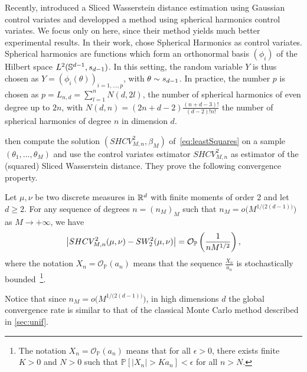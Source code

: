 {Recently, \citet{nguyen2024slicedwassersteinestimationcontrol} introduced a Sliced Wasserstein distance estimation using Gaussian control variates and \citet{leluc2024slicedwassersteinestimationsphericalharmonics} developped a method using spherical harmonics control variates. We focus only on \citet{leluc2024slicedwassersteinestimationsphericalharmonics} here, since their method yields much better experimental results.} 
In their work, \citet{leluc2024slicedwassersteinestimationsphericalharmonics} chose Spherical Harmonics
\citep{Muller1998} as control variates. 
Spherical harmonics are functions which form an orthonormal basis $(\phi_i)$ of the Hilbert space $L^2(\mathbb{S}^{d-1},s_{d-1})$.  
In this setting, the random variable $Y$ is thus chosen as $Y = (\phi_i(\theta))_{i = 1,\hdots,p}$, with $\theta \sim s_{d-1}$. In practice, the number $p$  is chosen as $p = L_{n,d} = \displaystyle\sum\limits_{l = 1}^n N(d,2l)$, the number of spherical harmonics of even degree up to $2n$, with $N(d,n) = (2n +d -2)\frac{(n + d -3)!}{(d-2)!n!}$ the number of spherical harmonics of degree $n$ in dimension $d$.




\citet{leluc2024slicedwassersteinestimationsphericalharmonics} then compute the  solution $(SHCV_{M,n}^2,\beta_M)$ of~\eqref{eq:leastSquares} on a sample $(\theta_1,\hdots,\theta_M)$ and use the control variates estimator $SHCV_{M,n}^2$ as  estimator of the (squared) Sliced Wasserstein distance. 
They prove the following convergence property.
\begin{Prop}
Let $\mu,\nu$ be two discrete measures in $\mathbb{R}^d$ with finite moments of order 2 and let $d \geq 2$.
For any sequence of degrees $n = (n_M)_M$ such that $n_M = o\bigg(M^{1/\big(2(d-1)\big)}\bigg)$ as $M\longrightarrow +\infty$, we have
\begin{equation}\label{eq:SHCVConv}
\big|SHCV_{M,n}^2(\mu,\nu) - SW_2^2(\mu,\nu)\big| = \mathcal{O}_{\mathbb{P}}\left(\frac{1}{n M^{1/2}}\right), 
\end{equation}
where the notation $X_n = \mathcal{O}_{\mathbb{P}}(a_n)$ means that the sequence $\frac{X_n}{a_n}$ is stochastically bounded~\footnote{The notation $X_n = \mathcal{O}_{\mathbb{P}}(a_n)$ means that for all $\epsilon > 0$, there exists finite $K >0 $ and $N >0$ such that $\mathbb{P}[|X_n| > K a_n ]< \epsilon$ for all $n > N$.}.\end{Prop}


Notice that since $n_M = o\bigg(M^{1/\big(2(d-1)\big)}\bigg)$, in high dimensions $d$ the global convergence rate is similar to that of the classical Monte Carlo method described in \autoref{sec:unif}.
